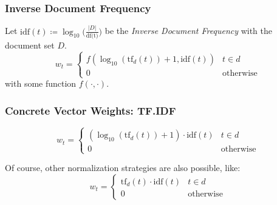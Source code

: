 \documentclass[a4paper, 11pt, accentcolor = tud3b]{tudreport}
\providecommand{\abs}[1]{\ensuremath{{\lvert #1 \rvert}}}
\begin{document}
                \subsubsection{Inverse Document Frequency} %
                	Let \( \text{idf}(t) \coloneqq \log_{10}\Big(\frac{\abs{D}}{\text{df(t)}}\Big) \) be the \textit{Inverse Document Frequency} with the document set \(D\).
               		\begin{equation*}
	               		w_t =
	               			\begin{cases}
		               			f(\log_{10}(\text{tf}_d(t)) + 1, \text{idf}(t)) & t \in d \\
		               			0 & \text{otherwise}
	               			\end{cases}
               		\end{equation*}
               		with some function \( f(\cdot, \cdot) \).

                \subsubsection{Concrete Vector Weights: TF.IDF} %
                    \begin{equation*}
	                    w_t =
	                    	\begin{cases}
		                    	(\log_{10}(\text{tf}_d(t)) + 1) \cdot \text{idf}(t) & t \in d \\
		                    	0 & \text{otherwise}
	                    	\end{cases}
                    \end{equation*}
                    
                    Of course, other normalization strategies are also possible, like:
                    \begin{equation*}
						w_t =
							\begin{cases}
								\text{tf}_d(t) \cdot \text{idf}(t) & t \in d \\
								0 & \text{otherwise}
							\end{cases}
					\end{equation*}
\end{document}
